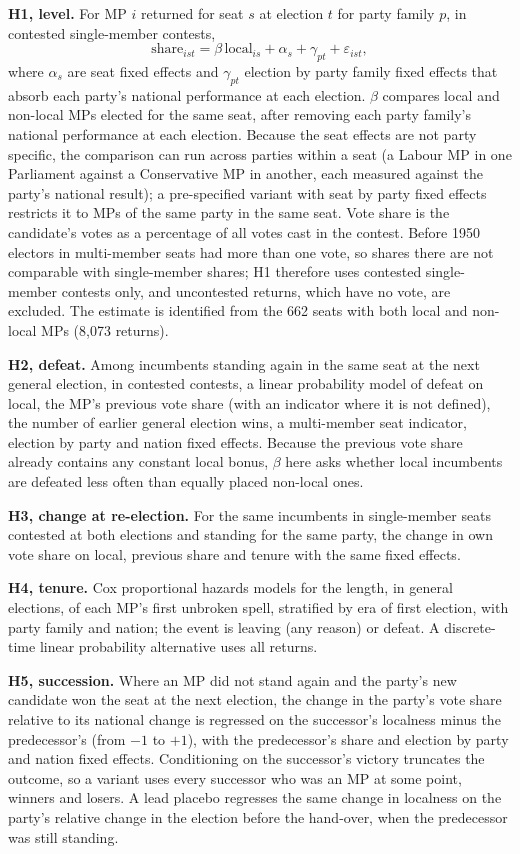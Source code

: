 \documentclass[11pt,a4paper]{article}
\begin{document}
\textbf{H1, level.} For MP $i$ returned for seat $s$ at election $t$ for party family $p$, in contested single-member contests,
\[ \text{share}_{ist} = \beta\, \text{local}_{is} + \alpha_s + \gamma_{pt} + \varepsilon_{ist}, \]
where $\alpha_s$ are seat fixed effects and $\gamma_{pt}$ election by party family fixed effects that absorb each party's national performance at each election. $\beta$ compares local and non-local MPs elected for the same seat, after removing each party family's national performance at each election. Because the seat effects are not party specific, the comparison can run across parties within a seat (a Labour MP in one Parliament against a Conservative MP in another, each measured against the party's national result); a pre-specified variant with seat by party fixed effects restricts it to MPs of the same party in the same seat. Vote share is the candidate's votes as a percentage of all votes cast in the contest. Before 1950 electors in multi-member seats had more than one vote, so shares there are not comparable with single-member shares; H1 therefore uses contested single-member contests only, and uncontested returns, which have no vote, are excluded. The estimate is identified from the 662 seats with both local and non-local MPs (8{,}073 returns).

\textbf{H2, defeat.} Among incumbents standing again in the same seat at the next general election, in contested contests, a linear probability model of defeat on local, the MP's previous vote share (with an indicator where it is not defined), the number of earlier general election wins, a multi-member seat indicator, election by party and nation fixed effects. Because the previous vote share already contains any constant local bonus, $\beta$ here asks whether local incumbents are defeated less often than equally placed non-local ones.

\textbf{H3, change at re-election.} For the same incumbents in single-member seats contested at both elections and standing for the same party, the change in own vote share on local, previous share and tenure with the same fixed effects.

\textbf{H4, tenure.} Cox proportional hazards models \citep{cox1972} for the length, in general elections, of each MP's first unbroken spell, stratified by era of first election, with party family and nation; the event is leaving (any reason) or defeat. A discrete-time linear probability alternative uses all returns.

\textbf{H5, succession.} Where an MP did not stand again and the party's new candidate won the seat at the next election, the change in the party's vote share relative to its national change is regressed on the successor's localness minus the predecessor's (from $-1$ to $+1$), with the predecessor's share and election by party and nation fixed effects. Conditioning on the successor's victory truncates the outcome, so a variant uses every successor who was an MP at some point, winners and losers. A lead placebo regresses the same change in localness on the party's relative change in the election before the hand-over, when the predecessor was still standing.
\end{document}

